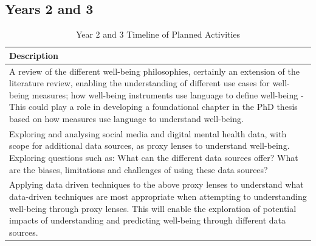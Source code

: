\documentclass[12pt]{article}
\begin{document}
\subsection*{Years 2 and 3}    
\centering
    \begin{longtable}{p{1\linewidth}}
    \centering
    \caption{Year 2 and 3 Timeline of Planned Activities}
    
    \hline
      Description \\ 
      \hline
      A review of the different well-being philosophies, certainly an extension of the literature review, enabling the understanding of different use cases for well-being measures; how well-being instruments use language to define well-being - This could play a role in developing a foundational chapter in the PhD thesis based on how measures use language to understand well-being.\\
      \hline
      Exploring and analysing social media and digital mental health data, with scope for additional data sources, as proxy lenses to understand well-being. Exploring questions such as:
      What can the different data sources offer?
      What are the biases, limitations and challenges of using these data sources?\\
      \hline
     Applying data driven techniques to the above proxy lenses to understand what data-driven techniques are most appropriate when attempting to understanding well-being through proxy lenses. This will enable the exploration of potential impacts of understanding and predicting well-being through different data sources.\\
      \hline
    \end{longtable}
    \label{tab:y23timeline}
\end{document}
